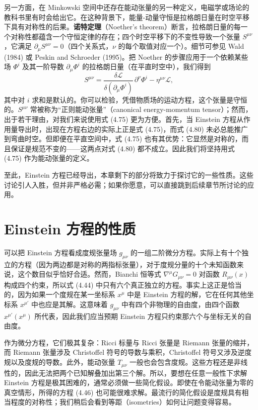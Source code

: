 另一方面，在 Minkowski 空间中还存在能动张量的另一种定义，电磁学或场论的教科书里有时会给出它。在这种背景下，能量-动量守恒是拉格朗日量在时空平移下具有对称性的后果。\textbf{诺特定理}（Noether's theorem）断言，拉格朗日量的每一个对称性都蕴含一个守恒定律的存在；四个时空平移下的不变性导致一个张量 $S^{\mu\nu}$，它满足 $\partial_\mu S^{\mu\nu}=0$（四个关系式，$\nu$ 的每个取值对应一个）。细节可参见 Wald (1984) 或 Peskin and Schroeder (1995)。把 Noether 的步骤应用于一个依赖某些场 $\Phi^i$ 及其一阶导数 $\partial_\mu\Phi^i$ 的拉格朗日量（在平直时空中），我们得到
\begin{equation*}
S^{\mu\nu} = \frac{\delta\mathcal{L}}{\delta(\partial_\mu\Phi^i)}\,\partial^\nu\Phi^i - \eta^{\mu\nu}\mathcal{L},
\tag{4.80}
\end{equation*}
其中对 $i$ 求和是默认的。你可以检验，凭借物质场的运动方程，这个张量是守恒的。$S^{\mu\nu}$ 常被称为“正则能动张量”（canonical energy-momentum tensor）；然而，出于若干理由，对我们来说使用式 (4.75) 更为方便。首先，当 Einstein 方程从作用量导出时，出现在方程右边的实际上正是式 (4.75)，而式 (4.80) 未必总能推广到弯曲时空。但即便在平直空间中，式 (4.75) 也有其优势：它显然是对称的，而且保证是规范不变的——这两点对式 (4.80) 都不成立。因此我们将坚持用式 (4.75) 作为能动张量的定义。

至此，Einstein 方程已经导出，本章剩下的部分将致力于探讨它的一些性质。这些讨论引人入胜，但并非严格必需；如果你愿意，可以直接跳到后续章节所讨论的应用。

\section{Einstein 方程的性质}

可以把 Einstein 方程看成度规张量场 $g_{\mu\nu}$ 的一组二阶微分方程。实际上有十个独立的方程（因为两边都是对称的两指标张量），对于度规分量的十个未知函数来说，这个数目似乎恰好合适。然而，Bianchi 恒等式 $\nabla^\mu G_{\mu\nu}=0$ 对函数 $R_{\mu\nu}(x)$ 构成四个约束，所以式 (4.44) 中只有六个真正独立的方程。事实上这正是恰当的，因为如果一个度规在某一坐标系 $x^\mu$ 中是 Einstein 方程的解，它在任何其他坐标系 $x^{\mu'}$ 中也应是其解。这意味着 $g_{\mu\nu}$ 中有四个非物理的自由度，由四个函数 $x^{\mu'}(x^\mu)$ 所代表，因此我们应当预期 Einstein 方程只约束那六个与坐标无关的自由度。

作为微分方程，它们极其复杂：Ricci 标量与 Ricci 张量是 Riemann 张量的缩并，而 Riemann 张量涉及 Christoffel 符号的导数与乘积，Christoffel 符号又涉及逆度规以及度规的导数。此外，能动张量 $T_{\mu\nu}$ 一般也会包含度规。这些方程还是非线性的，因此无法把两个已知解叠加出第三个解。所以，要想在任意一般性下求解 Einstein 方程是极其困难的，通常必须做一些简化假设。即使在令能动张量为零的真空情形，所得的方程 (4.46) 也可能很难求解。最流行的简化假设是度规具有相当程度的对称性；我们稍后会看到等距（isometries）如何让问题变得容易。


